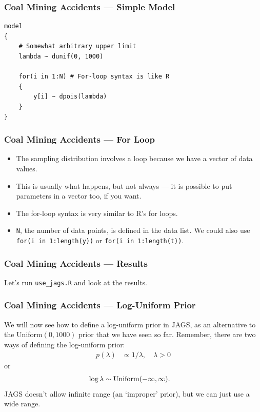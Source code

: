 \documentclass{beamer}
\begin{document}
\begin{frame}[fragile]
\frametitle{Coal Mining Accidents --- Simple Model}

\begin{verbatim}
model
{
    # Somewhat arbitrary upper limit
    lambda ~ dunif(0, 1000)

    for(i in 1:N) # For-loop syntax is like R
    {
        y[i] ~ dpois(lambda)
    }
}
\end{verbatim}

\end{frame}


\begin{frame}[fragile]
\frametitle{Coal Mining Accidents --- For Loop}
\begin{itemize}
\item The sampling distribution involves a loop because we have a vector
of data values.\pause
\item This is usually what happens, but not always --- it is possible to
put parameters in a vector too, if you want.\pause
\item The for-loop syntax is very similar to R's for loops.\pause
\item \texttt{N}, the number of data points, is defined in the
data list. We could also use \texttt{for(i in 1:length(y))} or
\texttt{for(i in 1:length(t))}.
\end{itemize}

\end{frame}


\begin{frame}[fragile]
\frametitle{Coal Mining Accidents --- Results}
Let's run \texttt{use\_jags.R} and look at the results.

\end{frame}



\begin{frame}
\frametitle{Coal Mining Accidents --- Log-Uniform Prior}
We will now see how to define a log-uniform prior in JAGS,
as an alternative to the Uniform$(0, 1000)$ prior that we have
seen so far. Remember, there are two ways of defining the
log-uniform prior:\pause
\begin{align}
p(\lambda) &\propto 1/\lambda, \quad \lambda > 0
\end{align}
\pause
or
\begin{align}
\log \lambda &\sim \textnormal{Uniform}(-\infty, \infty).
\end{align}
\pause
JAGS doesn't allow infinite range (an `improper' prior),
but we can just use a wide range.

\end{frame}
\end{document}
